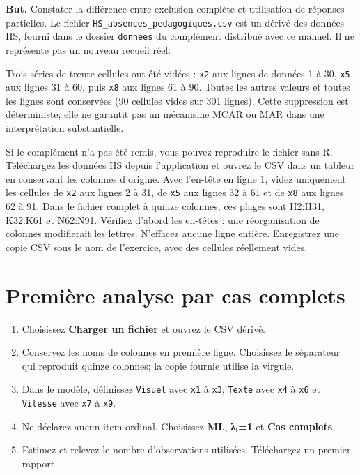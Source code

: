 \documentclass[
  french,
  11pt,
  a4paper,
  DIV=11,
  numbers=noendperiod]{scrreprt}
\providecommand{\tightlist}{%
  \setlength{\itemsep}{0pt}\setlength{\parskip}{0pt}}
\begin{document}
\textbf{But.} Constater la différence entre exclusion complète et
utilisation de réponses partielles. Le fichier
\texttt{HS\_absences\_pedagogiques.csv} est un dérivé des données HS,
fourni dans le dossier \texttt{donnees} du complément distribué avec ce
manuel. Il ne représente pas un nouveau recueil réel.

Trois séries de trente cellules ont été vidées : \texttt{x2} aux lignes
de données 1 à 30, \texttt{x5} aux lignes 31 à 60, puis \texttt{x8} aux
lignes 61 à 90. Toutes les autres valeurs et toutes les lignes sont
conservées (90 cellules vides sur 301 lignes). Cette suppression est
déterministe; elle ne garantit pas un mécanisme MCAR ou MAR dans une
interprétation substantielle.

Si le complément n'a pas été remis, vous pouvez reproduire le fichier
sans R. Téléchargez les données HS depuis l'application et ouvrez le CSV
dans un tableur en conservant les colonnes d'origine. Avec l'en-tête en
ligne 1, videz uniquement les cellules de \texttt{x2} aux lignes 2 à 31,
de \texttt{x5} aux lignes 32 à 61 et de \texttt{x8} aux lignes 62 à 91.
Dans le fichier complet à quinze colonnes, ces plages sont H2:H31,
K32:K61 et N62:N91. Vérifiez d'abord les en-têtes : une réorganisation
de colonnes modifierait les lettres. N'effacez aucune ligne entière.
Enregistrez une copie CSV sous le nom de l'exercice, avec des cellules
réellement vides.

\section{Première analyse par cas
complets}\label{premiuxe8re-analyse-par-cas-complets}

\begin{enumerate}
\def\labelenumi{\arabic{enumi}.}
\tightlist
\item
  Choisissez \textbf{Charger un fichier} et ouvrez le CSV dérivé.
\item
  Conservez les noms de colonnes en première ligne. Choisissez le
  séparateur qui reproduit quinze colonnes; la copie fournie utilise la
  virgule.
\item
  Dans le modèle, définissez \texttt{Visuel} avec \texttt{x1} à
  \texttt{x3}, \texttt{Texte} avec \texttt{x4} à \texttt{x6} et
  \texttt{Vitesse} avec \texttt{x7} à \texttt{x9}.
\item
  Ne déclarez aucun item ordinal. Choisissez \textbf{ML}, \textbf{λ₁=1}
  et \textbf{Cas complets}.
\item
  Estimez et relevez le nombre d'observations utilisées. Téléchargez un
  premier rapport.
\end{enumerate}
\end{document}
